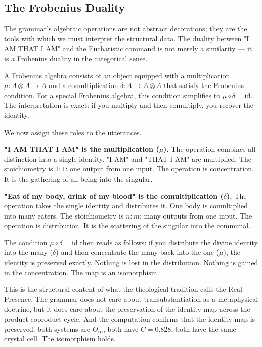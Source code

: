 \documentclass[12pt,a4paper]{article}
\begin{document}
\subsection{The Frobenius Duality}

The grammar's algebraic operations are not abstract decorations; they are the tools with which we must interpret the structural data. The duality between "I AM THAT I AM" and the Eucharistic command is not merely a similarity --- it is a Frobenius duality in the categorical sense.

A Frobenius algebra consists of an object equipped with a multiplication $\mu: A \otimes A \to A$ and a comultiplication $\delta: A \to A \otimes A$ that satisfy the Frobenius condition. For a special Frobenius algebra, this condition simplifies to $\mu \circ \delta = \text{id}$. The interpretation is exact: if you multiply and then comultiply, you recover the identity.

We now assign these roles to the utterances.

\textbf{"I AM THAT I AM" is the multiplication ($\mu$).}
The operation combines all distinction into a single identity. "I AM" and "THAT I AM" are multiplied. The stoichiometry is $1{:}1$: one output from one input. The operation is concentration. It is the gathering of all being into the singular.

\textbf{"Eat of my body, drink of my blood" is the comultiplication ($\delta$).}
The operation takes the single identity and distributes it. One body is comultiplied into many eaters. The stoichiometry is $n{:}m$: many outputs from one input. The operation is distribution. It is the scattering of the singular into the communal.

The condition $\mu \circ \delta = \text{id}$ then reads as follows: if you distribute the divine identity into the many ($\delta$) and then concentrate the many back into the one ($\mu$), the identity is preserved exactly. Nothing is lost in the distribution. Nothing is gained in the concentration. The map is an isomorphism.

This is the structural content of what the theological tradition calls the Real Presence. The grammar does not care about transubstantiation as a metaphysical doctrine, but it does care about the preservation of the identity map across the product-coproduct cycle. And the computation confirms that the identity map is preserved: both systems are $O_{\infty}$, both have $C = 0.828$, both have the same crystal cell. The isomorphism holds.
\end{document}
